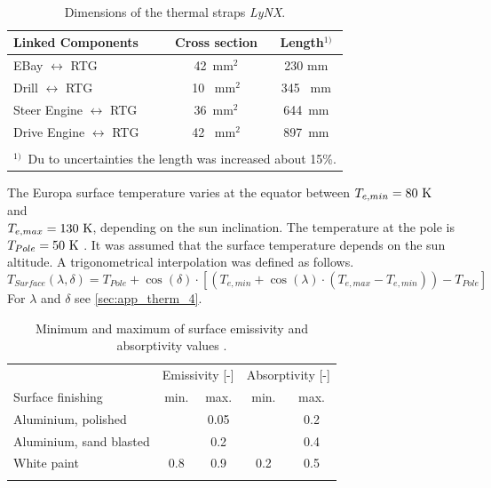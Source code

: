 \begin{table}[H]
	\centering
	\caption{Dimensions of the thermal straps \textit{LyNX}\textsuperscript{\tiny\textregistered}.}
	\begin{tabular}{l@{\quad}cc}
		\toprule
		Linked Components & Cross section  & Length$^{1)}$  \\ \midrule
		EBay $\leftrightarrow$ RTG & 42\ mm$^2$ & 230 mm  \\[0.25em] 
		Drill $\leftrightarrow$ RTG &10 \ mm$^2$ &345 \ mm \\[0.25em] 
		Steer Engine $\leftrightarrow$ RTG & 36\ mm$^2$&644\ mm  \\[0.25em] 
		Drive Engine $\leftrightarrow$ RTG &42 \ mm$^2$&897\ mm  \\[0.25em] \bottomrule
		& &   \\[-0.5em]
		\multicolumn{3}{l}{$^{1)}$\ Du to uncertainties the length was increased about 15\%.}\\[1em]
	\end{tabular}
	\label{tab:tcs_lynx}
\end{table}

The Europa surface temperature varies at the  equator between $T_{e,min}=80~{\rm K}$ and\\ $T_{e,max}=130~{\rm K}$, depending on the sun inclination.
The temperature at the pole is ${T_{Pole}=50~{\rm K}}$ \cite{Europa}.
It was assumed that the surface temperature depends on the sun altitude.
A trigonometrical interpolation was defined as follows.
\[ T_{Surface}(\lambda, \delta) = T_{Pole} + \cos (\delta) \cdot [(T_{e,min}+\cos (\lambda)\cdot (T_{e,max}-T_{e,min}))-T_{Pole}] \]
For $\lambda$ and $\delta$ see \autoref{sec:app_therm_4}.\\

\begin{table}[H]
	\centering
	\caption{Minimum and maximum of surface emissivity and absorptivity values \cite{ref_tcs_05}.}
	\begin{tabular}{l@{\qquad\qquad}cc@{\qquad\qquad}cc}
		\toprule
		& \multicolumn{2}{l}{Emissivity [-]} & \multicolumn{2}{l}{Absorptivity [-]}  \\ 
		Surface finishing	&	min. & max. 	&	min. & max.   \\\midrule
		Aluminium, polished & &0.05  & & 0.2   \\
		Aluminium, sand blasted & &0.2  & & 0.4   \\
		White paint & 0.8 & 0.9 & 0.2 & 0.5  \\ \bottomrule
		& & & & \\
	\end{tabular}
	\label{tab:tcs_surface}
\end{table}


